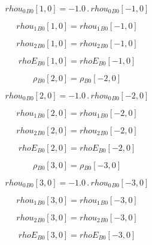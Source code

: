 \documentclass{article}
\begin{document}
\begin{dmath}{rhou_{0}{_{B0}}}[{1,0}] = - 1.0 \,.\, {rhou_{0}{_{B0}}}[{-1,0}]\end{dmath}

\begin{dmath}{rhou_{1}{_{B0}}}[{1,0}] = {rhou_{1}{_{B0}}}[{-1,0}]\end{dmath}

\begin{dmath}{rhou_{2}{_{B0}}}[{1,0}] = {rhou_{2}{_{B0}}}[{-1,0}]\end{dmath}

\begin{dmath}{rhoE{_{B0}}}[{1,0}] = {rhoE{_{B0}}}[{-1,0}]\end{dmath}

\begin{dmath}{\rho{_{B0}}}[{2,0}] = {\rho{_{B0}}}[{-2,0}]\end{dmath}

\begin{dmath}{rhou_{0}{_{B0}}}[{2,0}] = - 1.0 \,.\, {rhou_{0}{_{B0}}}[{-2,0}]\end{dmath}

\begin{dmath}{rhou_{1}{_{B0}}}[{2,0}] = {rhou_{1}{_{B0}}}[{-2,0}]\end{dmath}

\begin{dmath}{rhou_{2}{_{B0}}}[{2,0}] = {rhou_{2}{_{B0}}}[{-2,0}]\end{dmath}

\begin{dmath}{rhoE{_{B0}}}[{2,0}] = {rhoE{_{B0}}}[{-2,0}]\end{dmath}

\begin{dmath}{\rho{_{B0}}}[{3,0}] = {\rho{_{B0}}}[{-3,0}]\end{dmath}

\begin{dmath}{rhou_{0}{_{B0}}}[{3,0}] = - 1.0 \,.\, {rhou_{0}{_{B0}}}[{-3,0}]\end{dmath}

\begin{dmath}{rhou_{1}{_{B0}}}[{3,0}] = {rhou_{1}{_{B0}}}[{-3,0}]\end{dmath}

\begin{dmath}{rhou_{2}{_{B0}}}[{3,0}] = {rhou_{2}{_{B0}}}[{-3,0}]\end{dmath}

\begin{dmath}{rhoE{_{B0}}}[{3,0}] = {rhoE{_{B0}}}[{-3,0}]\end{dmath}
\end{document}
